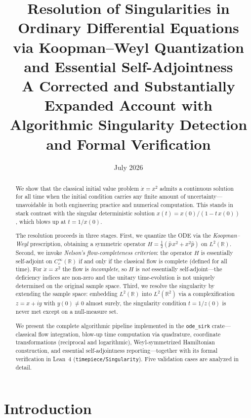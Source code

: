\documentclass[11pt,a4paper]{article}
\title{\textbf{Resolution of Singularities in Ordinary Differential Equations\\
via Koopman--Weyl Quantization and Essential Self-Adjointness}\\[6pt]
\large A Corrected and Substantially Expanded Account with\\
Algorithmic Singularity Detection and Formal Verification}
\author{}
\date{July 2026}
\newcommand{\Rset}{\mathbb{R}}
\begin{document}
\maketitle

\begin{abstract}
We show that the classical initial value problem $\dot{x}=x^{2}$ admits a
continuous solution for all time when the initial condition carries any
finite amount of uncertainty---unavoidable in both engineering practice and
numerical computation.  This stands in stark contrast with the singular
deterministic solution $x(t)=x(0)/(1-t\,x(0))$, which blows up at
$t=1/x(0)$.

The resolution proceeds in three stages.  First, we quantize the ODE via
the \emph{Koopman--Weyl} prescription, obtaining a symmetric operator
$H=\tfrac{1}{2}(\hat{p}\,x^{2}+x^{2}\hat{p})$ on $L^{2}(\Rset)$.
Second, we invoke \emph{Nelson's flow-completeness criterion}: the
operator $H$ is essentially self-adjoint on $C^{\infty}_{c}(\Rset)$ if and
only if the classical flow is complete (defined for all time).  For
$\dot{x}=x^{2}$ the flow is \emph{incomplete}, so $H$ is \emph{not}
essentially self-adjoint---the deficiency indices are non-zero and the
unitary time-evolution is not uniquely determined on the original sample
space.  Third, we resolve the singularity by extending the sample space:
embedding $L^{2}(\Rset)$ into $L^{2}(\Rset^{2})$ via a complexification
$z=x+iy$ with $y(0)\neq 0$ almost surely, the singularity condition
$t=1/z(0)$ is never met except on a null-measure set.

We present the complete algorithmic pipeline implemented in the
\texttt{ode\_sirk} crate---classical flow integration, blow-up time
computation via quadrature, coordinate transformations (reciprocal and
logarithmic), Weyl-symmetrized Hamiltonian construction, and essential
self-adjointness reporting---together with its formal verification in
Lean~4 (\texttt{timepiece/Singularity}).  Five validation cases are
analyzed in detail.
\end{abstract}

\tableofcontents
\newpage

\section{Introduction}\label{sec:intro}
\end{document}
